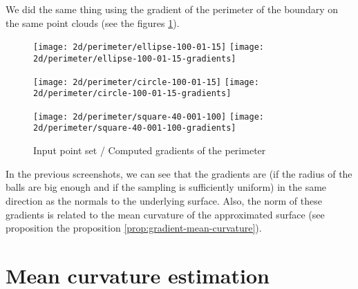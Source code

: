 We did the same thing using the gradient of the perimeter of the boundary on the
same point clouds (see the figures \ref{fig:gradients_perimeter_2d}).

\begin{figure}[h]
    \centering

    \begin{minipage}{0.8\linewidth}
        \centering
        \texttt{[image: 2d/perimeter/ellipse-100-01-15]}
        \texttt{[image: 2d/perimeter/ellipse-100-01-15-gradients]}
        \label{fig:gradients_perimeter_2d_ellipse}
    \end{minipage}

    \begin{minipage}{0.8\linewidth}
        \centering
        \texttt{[image: 2d/perimeter/circle-100-01-15]}
        \texttt{[image: 2d/perimeter/circle-100-01-15-gradients]}
        \label{fig:gradients_perimeter_2d_circle}
    \end{minipage}

    \begin{minipage}{0.8\linewidth}
        \centering
        \texttt{[image: 2d/perimeter/square-40-001-100]}
        \texttt{[image: 2d/perimeter/square-40-001-100-gradients]}
        \label{fig:gradients_perimeter_2d_square}
    \end{minipage}

    \caption{Input point set / Computed gradients of the perimeter}
    \label{fig:gradients_perimeter_2d}
\end{figure}

In the previous screenshots, we can see that the gradients are (if the radius of
the balls are big enough and if the sampling is sufficiently uniform) in the
same direction as the normals to the underlying surface. Also, the norm of
these gradients is related to the mean curvature of the approximated surface
(see proposition the proposition \ref{prop:gradient-mean-curvature}).

\section{Mean curvature estimation}

